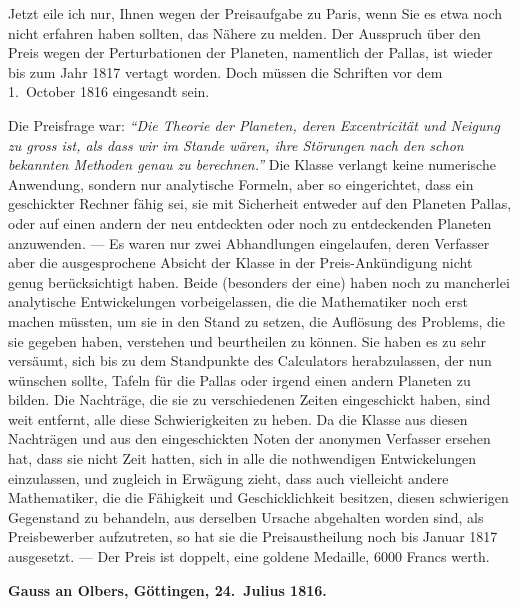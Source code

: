\documentclass[12pt,a4paper]{article}
\begin{document}
{ Jetzt eile ich nur, Ihnen wegen der Preisaufgabe zu Paris, wenn Sie es etwa noch nicht erfahren haben sollten, das Nähere zu melden. Der Ausspruch über den Preis wegen der Perturbationen der Planeten, namentlich der Pallas, ist wieder bis zum Jahr 1817 vertagt worden. Doch müssen die Schriften vor dem 1.~October 1816 eingesandt sein.

Die Preisfrage war: \textit{``Die Theorie der Planeten, deren Excentricität und Neigung zu gross ist, als dass wir im Stande wären, ihre Störungen nach den schon bekannten Methoden genau zu berechnen.''} Die Klasse verlangt keine numerische Anwendung, sondern nur analytische Formeln, aber so eingerichtet, dass ein geschickter Rechner fähig sei, sie mit Sicherheit entweder auf den Planeten Pallas, oder auf einen andern der neu entdeckten oder noch zu entdeckenden Planeten anzuwenden. --- Es waren nur zwei Abhandlungen eingelaufen, deren Verfasser aber die ausgesprochene Absicht der Klasse in der Preis-Ankündigung nicht genug berücksichtigt haben. Beide (besonders der eine) haben noch zu mancherlei analytische Entwickelungen vorbeigelassen, die die Mathematiker noch erst machen müssten, um sie in den Stand zu setzen, die Auflösung des Problems, die sie gegeben haben, verstehen und beurtheilen zu können. Sie haben es zu sehr versäumt, sich bis zu dem Standpunkte des Calculators herabzulassen, der nun wünschen sollte, Tafeln für die Pallas oder irgend einen andern Planeten zu bilden. Die Nachträge, die sie zu verschiedenen Zeiten eingeschickt haben, sind weit entfernt, alle diese Schwierigkeiten zu heben. Da die Klasse aus diesen Nachträgen und aus den eingeschickten Noten der anonymen Verfasser ersehen hat, dass sie nicht Zeit hatten, sich in alle die nothwendigen Entwickelungen einzulassen, und zugleich in Erwägung zieht, dass auch vielleicht andere Mathematiker, die die Fähigkeit und Geschicklichkeit besitzen, diesen schwierigen Gegenstand zu behandeln, aus derselben Ursache abgehalten worden sind, als Preisbewerber aufzutreten, so hat sie die Preisaustheilung noch bis Januar 1817 ausgesetzt. --- Der Preis ist doppelt, eine goldene Medaille, 6000 Francs werth. }

\newpage
\setcounter{page}{438}
%
\medskip\noindent
\textbf{Gauss an Olbers, Göttingen, 24.~Julius 1816.}
\end{document}
